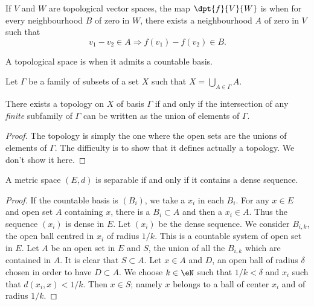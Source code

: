 \begin{definition}

If $V$ and $W$ are topological vector spaces, the map $\dpt{f}{V}{W}$ is  when for every neighbourhood $B$ of zero in $W$, there exists a neighbourhood $A$ of zero in $V$ such that
\[ 
  v_1-v_2\in A\Rightarrow f(v_1)-f(v_2)\in B.
\]
 \label{def:unif_cont}
\end{definition}


\begin{definition}
A topological space is  when it admits a countable basis.
\end{definition}

\begin{lemma}
Let $\Gamma$ be a family of subsets of a set $X$ such that $X=\bigcup_{A\in\Gamma}A$.

There exists a topology on $X$ of basis $\Gamma$ if and only if the intersection of any \emph{finite} subfamily of $\Gamma$ can be written as the union of elements of $\Gamma$.
\label{lem:topo_base}
\end{lemma}

\begin{proof}
The topology is simply the one where the open sets are the unions of elements of $\Gamma$.  The difficulty is to show that it defines actually a topology. We don't show it here.
\end{proof}

\begin{lemma}
A metric space $(E,d)$ is separable if and only if it contains a dense sequence.
\label{lem:sep_metric}
\end{lemma}

\begin{proof}
 If the countable basis is $(B_i)$, we take a $x_i$ in each $B_i$. For any $x\in E$ and open set $A$ containing $x$, there is a $B_i\subset A$ and then a $x_i\in A$. Thus the sequence $(x_i)$ is dense in $E$.
Let $(x_i)$ be the dense sequence. We consider $B_{i,k}$, the open ball centred in $x_i$ of radius $1/k$. This is a countable system of open set in $E$. Let $A$ be an open set in $E$ and $S$, the union of all the $B_{i,k}$ which are contained in $A$. It is clear that $S\subset A$. Let $x\in A$ and $D$, an open ball of radius $\delta$ chosen in order to have $D\subset A$. We choose $k\in\eN$ such that $1/k<\delta$ and $x_i$ such that $d(x_i,x)<1/k$. Then $x\in S$; namely $x$ belongs to a ball of center $x_i$ and of radius $1/k$.
\end{proof}

